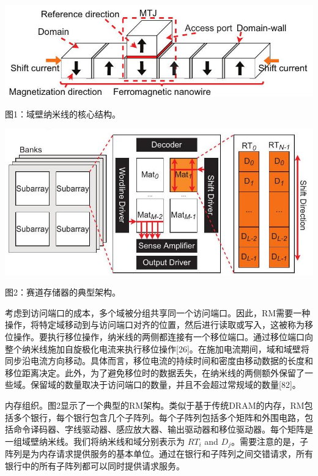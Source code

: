 \documentclass[10pt]{article}
\begin{document}
\begin{center}
\includegraphics[max width=\textwidth]{2024_05_12_abeba8a85da5b5ec4c7bg-03(1)}
\end{center}

图1：域壁纳米线的核心结构。

\begin{center}
\includegraphics[max width=\textwidth]{2024_05_12_abeba8a85da5b5ec4c7bg-03(5)}
\end{center}

图2：赛道存储器的典型架构。

考虑到访问端口的成本，多个域被分组共享同一个访问端口。因此，RM需要一种操作，将特定域移动到与访问端口对齐的位置，然后进行读取或写入，这被称为移位操作。要执行移位操作，纳米线的两侧都连接有一个移位端口。通过移位端口向整个纳米线施加自旋极化电流来执行移位操作[26]。在施加电流期间，域和域壁将同步沿电流方向移动。具体而言，移位电流的持续时间和密度由移动数据的长度和移位距离决定。此外，为了避免移位时的数据丢失，在纳米线的两侧额外保留了一些域。保留域的数量取决于访问端口的数量，并且不会超过常规域的数量[82]。

内存组织。图2显示了一个典型的RM架构。类似于基于传统DRAM的内存，RM包括多个银行，每个银行包含几个子阵列。每个子阵列包括多个矩阵和外围电路，包括命令译码器、字线驱动器、感应放大器、输出驱动器和移位驱动器。每个矩阵是一组域壁纳米线。我们将纳米线和域分别表示为 $R T_{i}$ and $D_{j}$。需要注意的是，子阵列是为内存请求提供服务的基本单位。通过在银行和子阵列之间交错请求，所有银行中的所有子阵列都可以同时提供请求服务。
\end{document}
